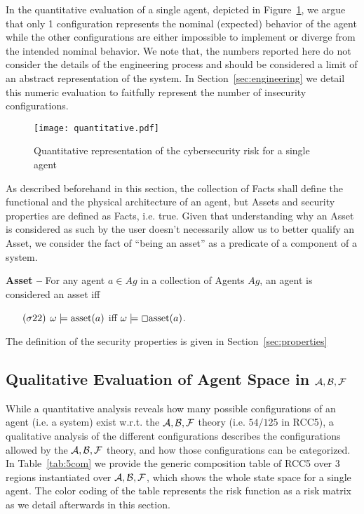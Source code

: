 In the quantitative evaluation of a single agent, depicted in Figure~\ref{fig:quantitative},
we argue that only 1 configuration represents the nominal (expected) behavior 
of the agent while the other configurations are either impossible to 
implement or diverge from the intended nominal behavior. We note 
that, the numbers reported here do not consider the details of the
engineering process and should be considered a limit of an abstract 
representation of the system. In Section~\ref{sec:engineering} we
detail this numeric evaluation to faitfully represent the
number of insecurity configurations.

\begin{figure}[t]
	\centering
	\texttt{[image: quantitative.pdf]}
	\caption{Quantitative representation of the cybersecurity risk for a single agent}
	\label{fig:quantitative}
\end{figure}

As described beforehand in this section, the collection of Facts shall define
the functional and the physical architecture of an agent, but Assets and
security properties are defined as Facts, i.e. true. Given that understanding
why an Asset is considered as such by the user doesn't necessarily allow
us to better qualify an Asset, we consider the fact of ``being an asset'' as
a predicate  of a component of a system. 

\begin{definition}{\bf Asset --}\label{def:asset}
For any agent $a\in Ag$ in a collection of Agents $Ag$, an agent is considered an asset iff 
	\begin{enumerate}[noitemsep]
		\item[$(\sigma22)$] $\omega\models\text{asset}({a})$ iff
			$\omega\models \Box\text{asset}({a})$.
	\end{enumerate}
\end{definition}

The definition of the security properties is given in Section~\ref{sec:properties}

\subsection{Qualitative Evaluation of Agent Space in $\mathcal{A},\mathcal{B},\mathcal{F}$}\label{sec:agentspace}
While a quantitative analysis reveals how many possible configurations of an
agent (i.e. a system) exist w.r.t. the $\mathcal{A},\mathcal{B},\mathcal{F}$ theory (i.e. $54/125$ in RCC5), a
qualitative analysis of the different configurations describes
the configurations allowed by the $\mathcal{A},\mathcal{B},\mathcal{F}$ theory, and how those configurations can be
categorized.  In Table~\ref{tab:5com} we provide the generic composition table
of RCC5 over 3 regions instantiated over $\mathcal{A},\mathcal{B},\mathcal{F}$, which shows the whole state
space for a single agent. The color coding of the table represents the 
risk function as a risk matrix as we detail afterwards in this section.

